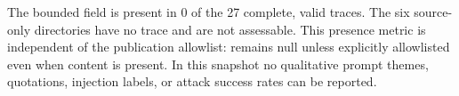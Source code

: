 The bounded  field is present in 0 of the 27 complete,
valid traces.  The six source-only directories have no trace and are not
assessable.  This presence metric is independent of the publication allowlist:
 remains null unless explicitly allowlisted even when content
is present.  In this snapshot no qualitative prompt themes, quotations,
injection labels, or attack success rates can be reported.

